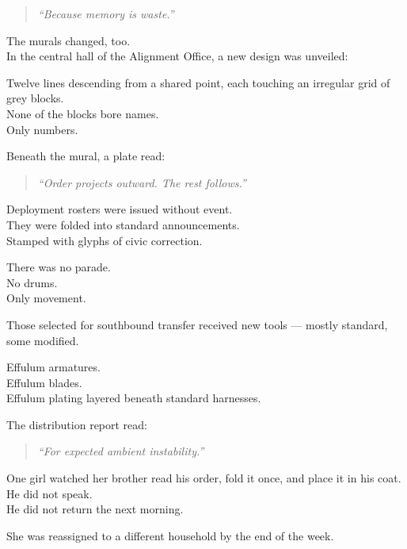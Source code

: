 \documentclass[12pt]{article}
\begin{document}
\begin{quote}
\textit{“Because memory is waste.”}
\end{quote}

\vspace{1em}

The murals changed, too.\\
In the central hall of the Alignment Office, a new design was unveiled:

Twelve lines descending from a shared point, each touching an irregular grid of grey blocks.\\
None of the blocks bore names.\\
Only numbers.

Beneath the mural, a plate read:

\begin{quote}
\textit{“Order projects outward. The rest follows.”}
\end{quote}

\vspace{1em}

Deployment rosters were issued without event.\\
They were folded into standard announcements.\\
Stamped with glyphs of civic correction.

There was no parade.\\
No drums.\\
Only movement.

Those selected for southbound transfer received new tools — mostly standard, some modified.

Effulum armatures.\\
Effulum blades.\\
Effulum plating layered beneath standard harnesses.

The distribution report read:

\begin{quote}
\textit{“For expected ambient instability.”}
\end{quote}

\vspace{1em}

One girl watched her brother read his order, fold it once, and place it in his coat.\\
He did not speak.\\
He did not return the next morning.

She was reassigned to a different household by the end of the week.

\vspace{1em}
\end{document}
